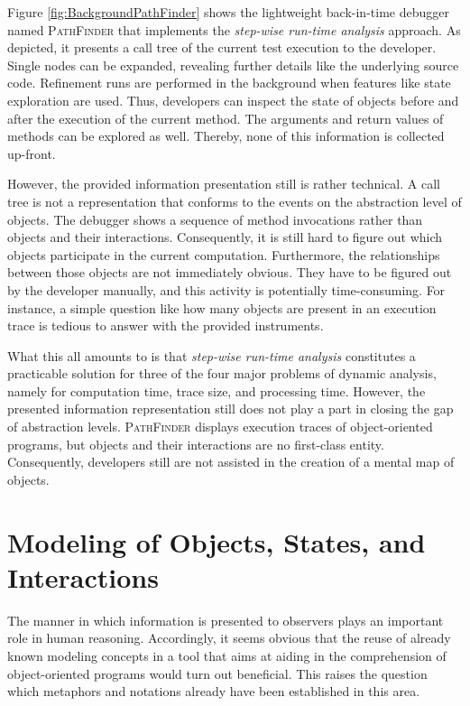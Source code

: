 Figure \ref{fig:BackgroundPathFinder} shows the lightweight back-in-time debugger named \textsc{PathFinder} that implements the \emph{step-wise run-time analysis} approach.
As depicted, it presents a call tree of the current test execution to the developer.
Single nodes can be expanded, revealing further details like the underlying source code.
Refinement runs are performed in the background when features like state exploration are used.
Thus, developers can inspect the state of objects before and after the execution of the current method.
The arguments and return values of methods can be explored as well.
Thereby, none of this information is collected up-front.

However, the provided information presentation still is rather technical.
A call tree is not a representation that conforms to the events on the abstraction level of objects.
The debugger shows a sequence of method invocations rather than objects and their interactions.
Consequently, it is still hard to figure out which objects participate in the current computation.
Furthermore, the relationships between those objects are not immediately obvious.
They have to be figured out by the developer manually, and this activity is potentially time-consuming.
For instance, a simple question like how many objects are present in an execution trace is tedious to answer with the provided instruments.

What this all amounts to is that \emph{step-wise run-time analysis} constitutes a practicable solution for three of the four major problems of dynamic analysis, namely for computation time, trace size, and processing time.
However, the presented information representation still does not play a part in closing the gap of abstraction levels.
\textsc{PathFinder} displays execution traces of object-oriented programs, but objects and their interactions are no first-class entity.
Consequently, developers still are not assisted in the creation of a mental map of objects.

\section[Modeling of Objects, States, and Interactions]{Modeling of Objects, States, and Interactions%
}
\label{s:BackgroundModeling}
The manner in which information is presented to observers plays an important role in human reasoning.
Accordingly, it seems obvious that the reuse of already known modeling concepts in a tool that aims at aiding in the comprehension of object-oriented programs would turn out beneficial.
This raises the question which metaphors and notations already have been established in this area.

